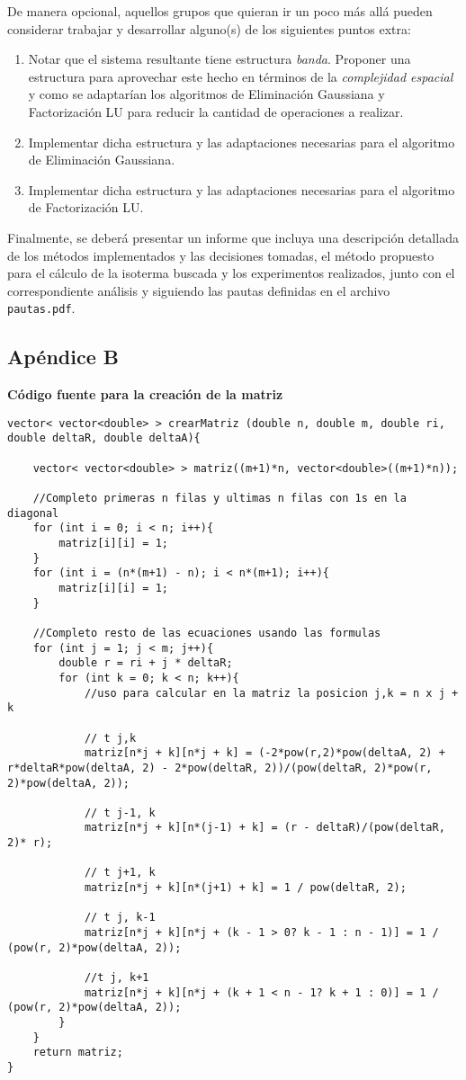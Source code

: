 De manera opcional, aquellos grupos que quieran ir un poco m\'as all\'a pueden considerar trabajar y desarrollar alguno(s) 
de los siguientes puntos extra:
\begin{enumerate}
\item Notar que el sistema resultante tiene estructura \emph{banda}. Proponer una estructura para aprovechar este hecho en t\'erminos de la
\emph{complejidad espacial} y como se adaptar\'ian los algoritmos de Eliminaci\'on Gaussiana y Factorizaci\'on LU para reducir la
cantidad de operaciones a realizar.
\item Implementar dicha estructura y las adaptaciones necesarias para el algoritmo de Eliminaci\'on Gaussiana.
\item Implementar dicha estructura y las adaptaciones necesarias para el algoritmo de Factorizaci\'on LU. 
\end{enumerate}

Finalmente, se deber\'a presentar un informe que incluya una descripci\'on detallada de los m\'etodos implementados y
las decisiones tomadas, el m\'etodo propuesto para el c\'alculo de la isoterma buscada y los experimentos realizados,
junto con el correspondiente an\'alisis y siguiendo las pautas definidas en el archivo \verb+pautas.pdf+.


\subsection{Apéndice B}

\textbf{Código fuente para la creación de la matriz}
\textbf{}

\lstset{language=C++, breaklines=true, basicstyle=\footnotesize}
\begin{lstlisting}[frame=single]
vector< vector<double> > crearMatriz (double n, double m, double ri, double deltaR, double deltaA){

	vector< vector<double> > matriz((m+1)*n, vector<double>((m+1)*n)); 

	//Completo primeras n filas y ultimas n filas con 1s en la diagonal
	for (int i = 0; i < n; i++){
		matriz[i][i] = 1;
	}
	for (int i = (n*(m+1) - n); i < n*(m+1); i++){
		matriz[i][i] = 1;
	}

	//Completo resto de las ecuaciones usando las formulas
	for (int j = 1; j < m; j++){
		double r = ri + j * deltaR;
		for (int k = 0; k < n; k++){
			//uso para calcular en la matriz la posicion j,k = n x j + k

			// t j,k
			matriz[n*j + k][n*j + k] = (-2*pow(r,2)*pow(deltaA, 2) + r*deltaR*pow(deltaA, 2) - 2*pow(deltaR, 2))/(pow(deltaR, 2)*pow(r, 2)*pow(deltaA, 2));
			
			// t j-1, k
			matriz[n*j + k][n*(j-1) + k] = (r - deltaR)/(pow(deltaR, 2)* r);

			// t j+1, k
			matriz[n*j + k][n*(j+1) + k] = 1 / pow(deltaR, 2);

			// t j, k-1
			matriz[n*j + k][n*j + (k - 1 > 0? k - 1 : n - 1)] = 1 / (pow(r, 2)*pow(deltaA, 2));

			//t j, k+1
			matriz[n*j + k][n*j + (k + 1 < n - 1? k + 1 : 0)] = 1 / (pow(r, 2)*pow(deltaA, 2));
		}
	}
	return matriz;
}
\end{lstlisting}

